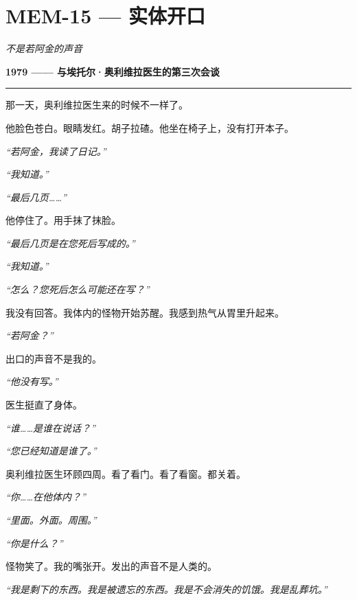 \section*{\textbf{MEM-15} --- 实体开口}

\noindent \textit{不是若阿金的声音}

\noindent \textbf{1979 —— 与埃托尔·奥利维拉医生的第三次会谈}

\vspace{0.5em}\noindent\rule{\textwidth}{0.5pt}\vspace{0.5em}

\noindent 那一天，奥利维拉医生来的时候不一样了。

\noindent 他脸色苍白。眼睛发红。胡子拉碴。他坐在椅子上，没有打开本子。

\noindent \textit{“若阿金，我读了日记。”}

\noindent \textit{“我知道。”}

\noindent \textit{“最后几页……”}

\noindent 他停住了。用手抹了抹脸。

\noindent \textit{“最后几页是在您死后写成的。”}

\noindent \textit{“我知道。”}

\noindent \textit{“怎么？您死后怎么可能还在写？”}

\noindent 我没有回答。我体内的怪物开始苏醒。我感到热气从胃里升起来。

\noindent \textit{“若阿金？”}

\noindent 出口的声音不是我的。

\noindent \textit{“他没有写。”}

\noindent 医生挺直了身体。

\noindent \textit{“谁……是谁在说话？”}

\noindent \textit{“您已经知道是谁了。”}

\noindent 奥利维拉医生环顾四周。看了看门。看了看窗。都关着。

\noindent \textit{“你……在他体内？”}

\noindent \textit{“里面。外面。周围。”}

\noindent \textit{“你是什么？”}

\noindent 怪物笑了。我的嘴张开。发出的声音不是人类的。

\noindent \textit{“我是剩下的东西。我是被遗忘的东西。我是不会消失的饥饿。我是乱葬坑。”}


